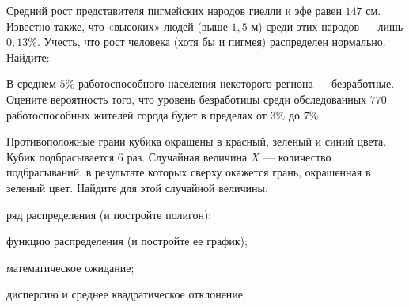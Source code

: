 \vfil

\begin{zkrPlain}{25}\noindent 
	Средний рост представителя пигмейских народов гиелли и эфе равен $147$ см. Известно также, что «высоких» людей (выше $1{,}5$ м) среди этих народов — лишь $0{,}13\%$. Учесть, что рост человека (хотя бы и пигмея) распределен нормально. Найдите: \par {}
 
\end{zkrPlain}

\vfil

\begin{zkrPlain}{25}\noindent 
	В среднем $ 5 \% $ работоспособного населения некоторого региона --- безработные. Оцените вероятность того, что уровень безработицы среди обследованных $ 770 $ работоспособных жителей города будет в пределах от $ 3 \% $ до $ 7 \% $.
 
\end{zkrPlain}

\newpage\setcounter{zad}{0}\setcounter{footnote}{0}



\begin{zkrPlain}{25}\noindent 
	Противоположные грани кубика окрашены в красный, зеленый и синий цвета. Кубик подбрасывается 6 раз. Случайная величина $X$ --- количество подбрасываний, в результате которых сверху окажется грань, окрашенная в зеленый цвет.  Найдите для этой случайной величины: \par \smallskip\small{ \par \zz ряд распределения (и постройте полигон); \par \zz функцию распределения (и постройте ее график); \par \zz математическое ожидание; \par \zz дисперсию и среднее квадратическое отклонение.\par \par}
 
\end{zkrPlain}

\vfil

